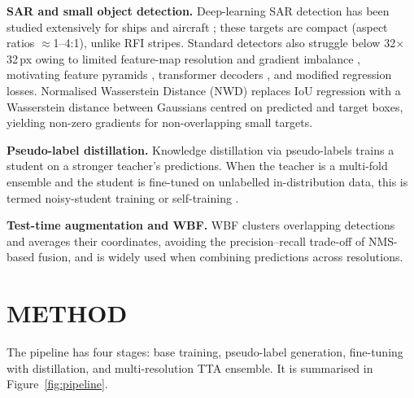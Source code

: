 \documentclass{article}
\begin{document}
\textbf{SAR and small object detection.} Deep-learning SAR detection
has been studied extensively for ships \cite{li2017ssdd,wang2019sarship}
and aircraft \cite{chen2016sartarget}; these targets are compact
(aspect ratios $\approx$1--4:1), unlike RFI stripes. Standard detectors
also struggle below 32$\times$32\,px owing to limited feature-map
resolution and gradient imbalance \cite{liu2021smallsurvey}, motivating
feature pyramids \cite{lin2017fpn}, transformer decoders
\cite{carion2020detr}, and modified regression losses. Normalised
Wasserstein Distance (NWD) \cite{wang2021nwd} replaces IoU regression
with a Wasserstein distance between Gaussians centred on predicted and
target boxes, yielding non-zero gradients for non-overlapping small
targets.

\textbf{Pseudo-label distillation.} Knowledge distillation via
pseudo-labels \cite{hinton2015distill,xie2020noisystudent} trains a
student on a stronger teacher's predictions. When the teacher is a
multi-fold ensemble and the student is fine-tuned on unlabelled
in-distribution data, this is termed noisy-student training
\cite{xie2020noisystudent} or self-training \cite{zoph2020rethinking}.

\textbf{Test-time augmentation and WBF.} WBF \cite{solovyev2021wbf}
clusters overlapping detections and averages their coordinates,
avoiding the precision--recall trade-off of NMS-based fusion, and is
widely used when combining predictions across resolutions.

\section{METHOD}
\label{sec:method}

The pipeline has four stages: base training, pseudo-label generation,
fine-tuning with distillation, and multi-resolution TTA ensemble. It is
summarised in Figure~\ref{fig:pipeline}.
\end{document}
